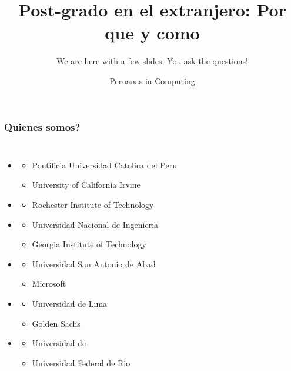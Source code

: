\documentclass[10pt]{beamer}
\author{Peruanas in Computing}
\title{Post-grado en el extranjero: Por que y como}
\subtitle{We are here with a few slides, You ask the questions!}
\begin{document}
\maketitle

\begin{frame}

\frametitle{Quienes somos?}
\begin{columns}[t]
\begin{itemize}
\item{{\color{blue}{Rosalva Gallardo Valencia}}
\begin{itemize}
  \item{Pontificia Universidad Catolica del Peru}
  \item{University of California Irvine}
\end{itemize}
}
\item{{\color{blue}{Meridangela Gutierrez Jhong}}
\begin{itemize}
  \item{Rochester Institute of Technology}
\end{itemize}
}
\item{{\color{blue}{Ana Huaman Quispe}}
\begin{itemize}
  \item{Universidad Nacional de Ingenieria}
  \item{Georgia Institute of Technology}
\end{itemize}
}
\item{{\color{magenta}{Rosa Enciso (Skype)}}
\begin{itemize}
  \item{Universidad San Antonio de Abad}
  \item{Microsoft}
\end{itemize}
}
\item{{\color{magenta}{Natalie Gil (Skype)}}
\begin{itemize}
  \item{Universidad de Lima}
  \item{Golden Sachs}  
\end{itemize}
}
\item{{\color{magenta}{Yesenia Yari (Skype)}}
\begin{itemize}
  \item{Universidad de }
  \item{Universidad Federal de Rio}  
\end{itemize}
}
\end{itemize}

\end{columns}
\end{frame}
\end{document}
